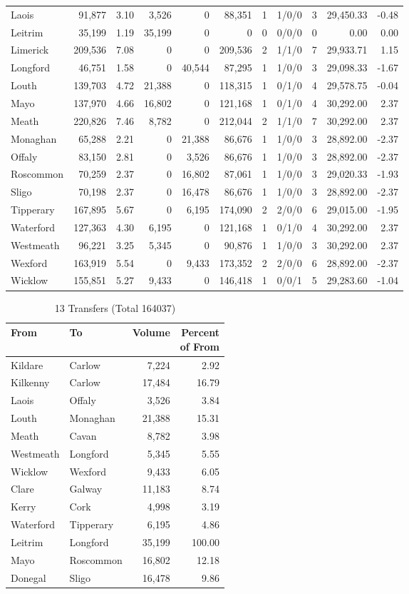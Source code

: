\documentclass[a4paper]{article}
\begin{document}
\begin{longtable}{lrrrrrrlrrr}
Laois&91,877& 3.10&3,526&0&88,351&1&1/0/0&3&29,450.33&-0.48\\ 
Leitrim&35,199& 1.19&35,199&0&0&0&0/0/0&0& 0.00& 0.00\\ 
Limerick&209,536& 7.08&0&0&209,536&2&1/1/0&7&29,933.71& 1.15\\ 
Longford&46,751& 1.58&0&40,544&87,295&1&1/0/0&3&29,098.33&-1.67\\ 
Louth&139,703& 4.72&21,388&0&118,315&1&0/1/0&4&29,578.75&-0.04\\ 
Mayo&137,970& 4.66&16,802&0&121,168&1&0/1/0&4&30,292.00& 2.37\\ 
Meath&220,826& 7.46&8,782&0&212,044&2&1/1/0&7&30,292.00& 2.37\\ 
Monaghan&65,288& 2.21&0&21,388&86,676&1&1/0/0&3&28,892.00&-2.37\\ 
Offaly&83,150& 2.81&0&3,526&86,676&1&1/0/0&3&28,892.00&-2.37\\ 
Roscommon&70,259& 2.37&0&16,802&87,061&1&1/0/0&3&29,020.33&-1.93\\ 
Sligo&70,198& 2.37&0&16,478&86,676&1&1/0/0&3&28,892.00&-2.37\\ 
Tipperary&167,895& 5.67&0&6,195&174,090&2&2/0/0&6&29,015.00&-1.95\\ 
Waterford&127,363& 4.30&6,195&0&121,168&1&0/1/0&4&30,292.00& 2.37\\ 
Westmeath&96,221& 3.25&5,345&0&90,876&1&1/0/0&3&30,292.00& 2.37\\ 
Wexford&163,919& 5.54&0&9,433&173,352&2&2/0/0&6&28,892.00&-2.37\\ 
Wicklow&155,851& 5.27&9,433&0&146,418&1&0/0/1&5&29,283.60&-1.04\\ 
\end{longtable}

\begin{table}[htbp]
\caption{13 Transfers (Total 164037)}
\centering
\begin{tabular}{llrr} \toprule
From &To &Volume &\shortstack{Percent\\of From} \\ \midrule
Kildare&Carlow&7,224& 2.92\\ 
Kilkenny&Carlow&17,484&16.79\\ 
Laois&Offaly&3,526& 3.84\\ 
Louth&Monaghan&21,388&15.31\\ 
Meath&Cavan&8,782& 3.98\\ 
Westmeath&Longford&5,345& 5.55\\ 
Wicklow&Wexford&9,433& 6.05\\ 
Clare&Galway&11,183& 8.74\\ 
Kerry&Cork&4,998& 3.19\\ 
Waterford&Tipperary&6,195& 4.86\\ 
Leitrim&Longford&35,199&100.00\\ 
Mayo&Roscommon&16,802&12.18\\ 
Donegal&Sligo&16,478& 9.86\\ 
\bottomrule
\end{tabular}
\end{table}
\end{document}
